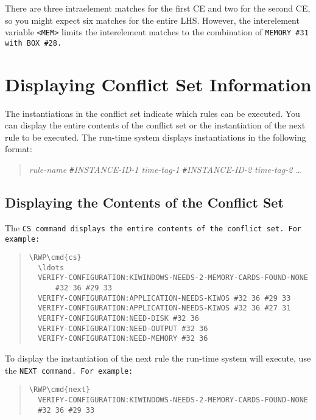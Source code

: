 There are three intraelement matches for the first CE and two for the
second CE, so you might expect six matches for the entire
LHS. However, the interelement variable \verb|<MEM>| limits the
interelement matches to the combination of \tt{MEMORY} \verb|#31| with
\tt{BOX} \verb|#28|.

\section{Displaying Conflict Set Information}

The instantiations in the conflict set indicate which rules can be
executed. You can display the entire contents of the conflict set or
the instantiation of the next rule to be executed. The run-time system
displays instantiations in the following format:

\begin{quote}
  \it{rule-name} \verb|#|\it{INSTANCE-ID-1} \it{time-tag-1}
  \verb|#|\it{INSTANCE-ID-2} \it{time-tag-2} \ldots
\end{quote}

\subsection{Displaying the Contents of the Conflict Set}

The \tt{CS} command displays the entire contents of the conflict set.
For example:

\begin{quote}
\begin{Verbatim}[commandchars=\\\{\}]
\RWP\cmd{cs}
  \ldots
  VERIFY-CONFIGURATION:KIWINDOWS-NEEDS-2-MEMORY-CARDS-FOUND-NONE
      #32 36 #29 33
  VERIFY-CONFIGURATION:APPLICATION-NEEDS-KIWOS #32 36 #29 33
  VERIFY-CONFIGURATION:APPLICATION-NEEDS-KIWOS #32 36 #27 31
  VERIFY-CONFIGURATION:NEED-DISK #32 36
  VERIFY-CONFIGURATION:NEED-OUTPUT #32 36
  VERIFY-CONFIGURATION:NEED-MEMORY #32 36
\end{Verbatim}
\end{quote}

To display the instantiation of the next rule the run-time
system will execute, use the \tt{NEXT} command. For example:

\begin{quote}
\begin{Verbatim}[commandchars=\\\{\}]
\RWP\cmd{next}
  VERIFY-CONFIGURATION:KIWINDOWS-NEEDS-2-MEMORY-CARDS-FOUND-NONE
  #32 36 #29 33
\end{Verbatim}
\end{quote}

